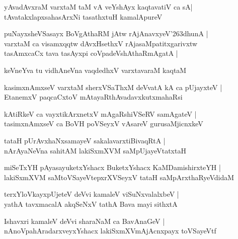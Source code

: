\begin{shloka}
yAvadAvxraM varxtaM taM vA veYshAyx kaqtavatiV ca sA|\\
tAvatakxlapxsahasArxNi tasathxtuH kamalApureV
\end{shloka}

\begin{shloka}
puNayxsheVSasayx BoVgAthaRM jAtw rAjAnavxyeV\char'263dhunA |\\
varxtaM ca visamxqqtw dAvxHsethxV rAjasaMpatitxgarivxtw\\
tasAmxcaCx tava tasAyxpi coVpadeVshAthaRmAgatA |
\end{shloka}

\begin{shloka}
keVneYva tu vidhAneVna vaqdedhxV varxtavaraM kaqtaM
\end{shloka}

\begin{shloka}
kasimxnAmxseV varxtaM sherxVSaThxM deVvatA kA ca pUjayxteV |\\
EtanemxV paqcaCxtoV mAtayaRthAvadavxkutxmahaRsi
\end{shloka}

\begin{shloka}
kAtiRkeV ca vayxtikArxnetxV mAgaRshiVSeRV samAgateV |\\
tasimxnAmxseV ca BoVH poVSeyxV vAsareV gurusaMjicnxkeV 
\end{shloka}

\begin{shloka}
tataH pUrAvxhaNxsamayeV sakalavarxtiBivaqRtA |\\
nArAyaNeVna sahitAM lakiSxmXVM saMpUjayeVtatxtaH
\end{shloka}

\begin{shloka}
miSeTxYH pAyasayuketxYshacx BuketxYshacx KaMDamishirxteYH |\\
lakiSxmXVM saMtoVSayeVtepxrXVSeyxV tataH saMpArxthaRyeVdidaM
\end{shloka}

\begin{shloka}
terxYloVkayxpUjeteV deVvi kamaleV viSuNxvalalxbeV |\\
yathA tavxmacalA akqSeNxV tathA Bava mayi sithxtA
\end{shloka}

\begin{shloka}
Ishavxri kamaleV deVvi sharaNaM ca BavAnaGeV |\\
nAnoVpahAradarxveyxYshacx lakiSxmXVmAjAcnxpayx toVSayeVtf
\end{shloka}

